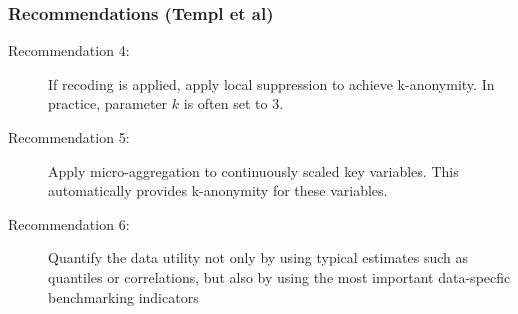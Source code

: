 \documentclass{beamer}
\begin{document}
\begin{frame}
	\frametitle{Recommendations (Templ et al)}
	\begin{description}
		\item[Recommendation 4:] If recoding is applied, apply local suppression to achieve
		k-anonymity. In practice, parameter $k$ is often set to 3.
		\item[Recommendation 5:] Apply micro-aggregation to continuously scaled key variables. This automatically provides k-anonymity for these variables.
		\item[Recommendation 6:] Quantify the data utility not only by using typical estimates such as quantiles or correlations, but also by using the most important
		data-specfic benchmarking indicators
	\end{description}
\end{frame}
\end{document}
